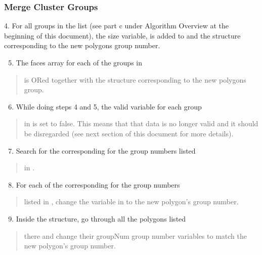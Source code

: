 \documentclass[letterpaper,10pt,english]{sphinxmanual}
\begin{document}
\subsubsection{Merge Cluster Groups}
\label{dfngen:merge-cluster-groups}
4.      For all groups in the
 list (see part c under Algorithm Overview at the beginning
of this document), the  size variable, is added to and the
 structure corresponding to the new polygons group number.
\begin{enumerate}
\setcounter{enumi}{4}
\item {} 
The  faces array for each of the groups in

\end{enumerate}
\begin{quote}

 is ORed together with the  structure
corresponding to the new polygons group.
\end{quote}
\begin{enumerate}
\setcounter{enumi}{5}
\item {} 
While doing steps 4 and 5, the  valid variable for each group

\end{enumerate}
\begin{quote}

in  is set to false. This means that that
 data is no longer valid and it should be disregarded (see
next section of this document for more details).
\end{quote}
\begin{enumerate}
\setcounter{enumi}{6}
\item {} 
Search for the corresponding  for the group numbers listed

\end{enumerate}
\begin{quote}

in .
\end{quote}
\begin{enumerate}
\setcounter{enumi}{7}
\item {} 
For each of the corresponding  for the group numbers

\end{enumerate}
\begin{quote}

listed in , change the  variable in
 to the new polygon’s group number.
\end{quote}
\begin{enumerate}
\setcounter{enumi}{8}
\item {} 
Inside the  structure, go through all the polygons listed

\end{enumerate}
\begin{quote}

there and change their groupNum group number variables to match the new
polygon’s group number.
\end{quote}
\end{document}
